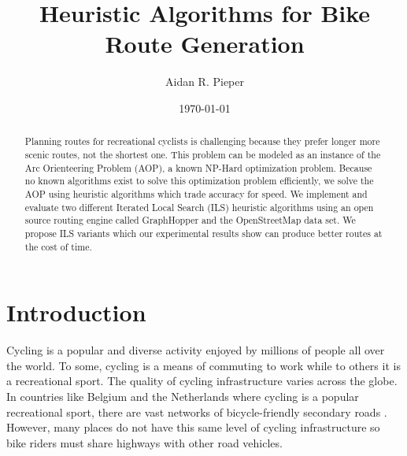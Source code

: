 \documentclass[honors]{union-cs-thesis}
\begin{document}

\title{Heuristic Algorithms for Bike Route Generation}
\author{Aidan R. Pieper}
\date{\today}


\maketitle

\begin{abstract}
\makeabstract

Planning routes for recreational cyclists is challenging because they prefer longer more scenic routes, not the shortest one. This problem can be modeled as an instance of the Arc Orienteering Problem (AOP), a known NP-Hard optimization problem. Because no known algorithms exist to solve this optimization problem efficiently, we solve the AOP using  heuristic algorithms which trade accuracy for speed. We implement and evaluate two different Iterated Local Search (ILS) heuristic algorithms using an open source routing engine called GraphHopper and the OpenStreetMap data set. We propose ILS variants which our experimental results show can produce better routes at the cost of time. 

\end{abstract}

\tableofcontents
\listoffigures %
\listoftables %
\makepreamble


\section{Introduction}
Cycling is a popular and diverse activity enjoyed by millions of people all over the world. To some, cycling is a means of commuting to work while to others it is a recreational sport.  The quality of cycling infrastructure varies across the globe. In countries like Belgium and the Netherlands where cycling is a popular recreational sport, there are vast networks of bicycle-friendly secondary roads \cite{souffriau2011planning}. However, many places do not have this same level of cycling infrastructure so bike riders must share highways with other road vehicles.
\end{document}
